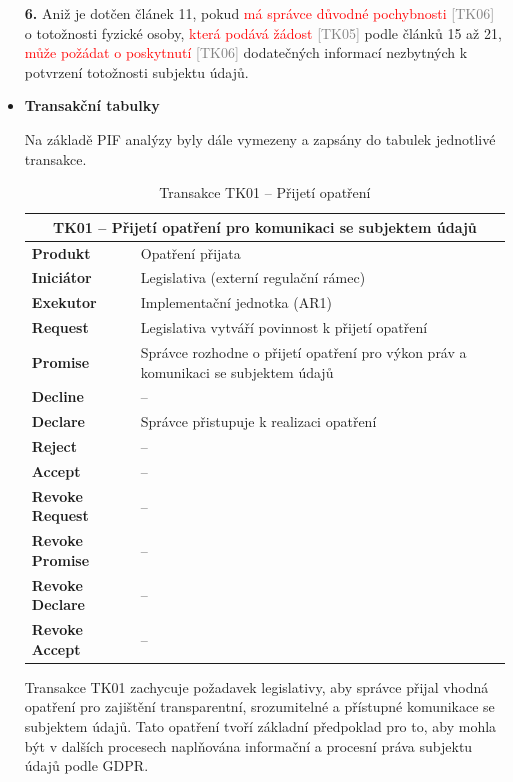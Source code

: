 \begin{itemize}
  \vspace{0.5em}
  \textbf{6.} Aniž je dotčen článek 11, pokud \textcolor{red}{má správce důvodné pochybnosti} \textcolor{gray}{[TK06]} o totožnosti fyzické osoby, \textcolor{red}{která podává žádost} \textcolor{gray}{[TK05]} podle článků 15 až 21, \textcolor{red}{může požádat o poskytnutí} \textcolor{gray}{[TK06]} \textcolor{OliveGreen}{dodatečných informací nezbytných k potvrzení totožnosti subjektu údajů}.

  \item \textbf{Transakční tabulky}
  
  Na základě PIF analýzy byly dále vymezeny a zapsány do tabulek jednotlivé transakce. 

  \begin{table}[H]
    \centering
    \renewcommand{\arraystretch}{1.2}
    \begin{tabular}{|p{3.1cm}|p{9.9cm}|}
    \hline
    \multicolumn{2}{|c|}{\textbf{TK01 – Přijetí opatření pro komunikaci se subjektem údajů}} \\
    \hline
    \textbf{Produkt} & Opatření přijata \\
    \hline
    \textbf{Iniciátor} & Legislativa (externí regulační rámec) \\
    \hline
    \textbf{Exekutor} & Implementační jednotka (AR1) \\
    \hline
    \textbf{Request} & Legislativa vytváří povinnost k přijetí opatření \\
    \hline
    \textbf{Promise} & Správce rozhodne o přijetí opatření pro výkon práv a komunikaci se subjektem údajů \\
    \hline
    \textbf{Decline} & – \\
    \hline
    \textbf{Declare} & Správce přistupuje k realizaci opatření \\
    \hline
    \textbf{Reject} & – \\
    \hline
    \textbf{Accept} & – \\
    \hline
    \textbf{Revoke Request} & – \\
    \hline
    \textbf{Revoke Promise} & – \\
    \hline
    \textbf{Revoke Declare} & – \\
    \hline
    \textbf{Revoke Accept} & – \\
    \hline
    \end{tabular}
    \caption{Transakce TK01 – Přijetí opatření}
  \end{table}

  Transakce TK01 zachycuje požadavek legislativy, aby správce přijal vhodná opatření pro zajištění transparentní, srozumitelné a přístupné komunikace se subjektem údajů. Tato opatření tvoří základní předpoklad pro to, aby mohla být v dalších procesech naplňována informační a procesní práva subjektu údajů podle GDPR.


\end{itemize}
